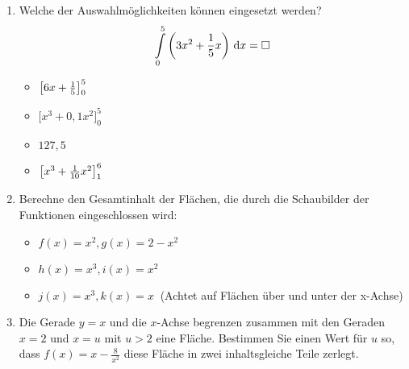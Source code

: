 \begin{enumerate}
	\item Welche der Auswahlmöglichkeiten können eingesetzt werden?
	\begin{equation*}
		\int\limits_0^5 \left(3x^2+ \frac 1 5 x\right)  \,\mathrm{d} x = \Box
	\end{equation*}
  \begin{multicols}{4}
    \begin{itemize}
      \item $\left[ 6x + \frac{1}{5} \right]_0^5$
      \item $\bigg[x^3 + 0,1 x^2\bigg]_0^5$
  		\item $127,5$
      \item $\left[ x^3 + \frac{1}{10} x^2 \right]_1^6$
  	\end{itemize}
  \end{multicols}
  \item Berechne den Gesamtinhalt der Flächen, die durch die Schaubilder der Funktionen eingeschlossen wird:
  \begin{itemize}
    \item $f(x)=x^2, g(x)=2-x^2$
    \item $h(x)=x^3, i(x)=x^2$
    \item $j(x)=x^3, k(x)=x\ $ (Achtet auf Flächen über und unter der x-Achse)
  \end{itemize}
	\item Die Gerade $y=x$ und die $x$-Achse begrenzen zusammen mit den Geraden $x=2$ und $x=u$ mit $u>2$ eine Fläche. Bestimmen Sie einen Wert für $u$ so, dass $f(x)=x-\frac{8}{x^2}$ diese Fläche in zwei inhaltsgleiche Teile zerlegt. \cas
\end{enumerate}
